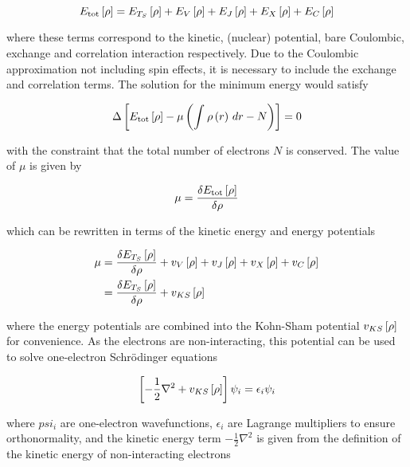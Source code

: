 \begin{equation}
    E_{\text{tot}} \left[ \rho \right] = E_{T_S} \left[ \rho \right] + E_{V} \left[ \rho \right] + E_{J} \left[ \rho \right] + E_{X} \left[ \rho \right] + E_{C} \left[ \rho \right]
\end{equation}

where these terms correspond to the kinetic, (nuclear) potential, bare Coulombic,
exchange and correlation interaction respectively. Due to the Coulombic approximation
not including spin effects, it is necessary to include the exchange and correlation
terms. The solution for the minimum energy would satisfy

\begin{equation}
    \Delta \left[  E_{\text{tot}} \left[ \rho \right]  - \mu \left( \int_{}^{} \rho\left(r\right) \,dr - N \right) \right] = 0
\end{equation}

with the constraint that the total number of electrons $N$ is conserved. The value
of $\mu$ is given by

\begin{equation}
    \mu = \frac{\delta  E_{\text{tot}} \left[ \rho \right]}{\delta \rho}
\end{equation}

which can be rewritten in terms of the kinetic energy and energy potentials

\begin{equation}
    \begin{split}
        \mu &= \frac{\delta  E_{T_S} \left[ \rho \right]}{\delta \rho} + v_{V} \left[ \rho \right] + v_{J} \left[ \rho \right] + v_{X} \left[ \rho \right] + v_{C} \left[ \rho \right] \\
            &= \frac{\delta  E_{T_S} \left[ \rho \right]}{\delta \rho} + v_{KS} \left[ \rho \right]
    \end{split}
\end{equation}

where the energy potentials are combined into the Kohn-Sham potential $v_{KS} \left[ \rho \right]$ for
convenience. As the electrons are non-interacting, this potential can be used to
solve one-electron Schrödinger equations

\begin{equation}
    \left[ -\frac{1}{2} \nabla^2 + v_{KS} \left[ \rho \right] \right] \psi_i = \epsilon_i \psi_i
\end{equation}

where $psi_i$ are one-electron wavefunctions, $\epsilon_i$ are Lagrange multipliers
to ensure orthonormality, and the kinetic energy term $-\frac{1}{2} \nabla ^2$ is
given from the definition of the kinetic energy of non-interacting electrons


